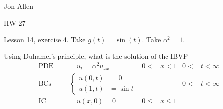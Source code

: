\documentclass{article}
\begin{document}
Jon Allen

HW 27

Lesson 14, exercise 4. Take $g(t)=\sin(t)$. Take $\alpha^2=1$.

Using Duhamel's principle, what is the solution of the IBVP
\begin{align*}
  \text{PDE}&&&\quad u_t=\alpha^2u_{xx}&0<&x<1&0<&t<\infty\\
  \text{BCs}&&&
  \begin{cases}
  u(0,t)&=0\\
  u(1,t)&=\sin t
  \end{cases}
  &&&0<&t<\infty\\
  \text{IC}&&&\quad u(x,0)=0&0\le&x\le1
\end{align*}
\end{document}
